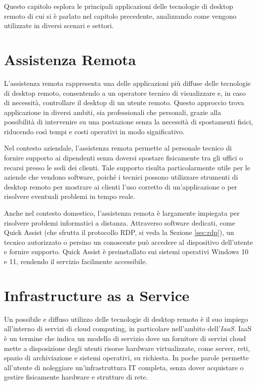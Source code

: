 \documentclass[12pt,a4paper,openright,twoside]{book}
\begin{document}
Questo capitolo esplora le principali applicazioni delle tecnologie di desktop remoto di cui si è parlato nel capitolo precedente, analizzando come vengono utilizzate in diversi scenari e settori.


\section{Assistenza Remota}
\label{sec:remote-assistance}

L'assistenza remota rappresenta una delle applicazioni più diffuse delle tecnologie di desktop remoto, consentendo a un operatore tecnico di visualizzare e, in caso di necessità, controllare il desktop di un utente remoto. Questo approccio trova applicazione in diversi ambiti, sia professionali che personali, grazie alla possibilità di intervenire su una postazione senza la necessità di spostamenti fisici, riducendo così tempi e costi operativi in modo significativo.

Nel contesto aziendale, l'assistenza remota permette al personale tecnico di fornire supporto ai dipendenti senza doversi spostare fisicamente tra gli uffici o recarsi presso le sedi dei clienti. Tale supporto risulta particolarmente utile per le aziende che vendono software, poiché i tecnici possono utilizzare strumenti di desktop remoto per mostrare ai clienti l'uso corretto di un'applicazione o per risolvere eventuali problemi in tempo reale. 

Anche nel contesto domestico, l’assistenza remota è largamente impiegata per risolvere problemi informatici a distanza. Attraverso software dedicati, come Quick Assist (che sfrutta il protocollo RDP, si veda la Sezione \ref{sec:rdp}), un tecnico autorizzato o persino un conoscente può accedere al dispositivo dell’utente e fornire supporto. Quick Assist è preinstallato sui sistemi operativi Windows 10 e 11, rendendo il servizio facilmente accessibile.


\section{Infrastructure as a Service}
\label{sec:iaas}
Un possibile e diffuso utilizzo delle tecnologie di desktop remoto è il suo impiego all'interno di servizi di cloud computing, in particolare nell'ambito dell'\emph{\ac{IaaS}}.
IaaS è un termine che indica un modello di servizio dove un fornitore di servizi cloud mette a disposizione degli utenti risorse hardware virtualizzate, come server, reti, spazio di archiviazione e sistemi operativi, su richiesta. In poche parole permette all'utente di noleggiare un'infrastruttura IT completa, senza dover acquistare o gestire fisicamente hardware e strutture di rete.
\end{document}
